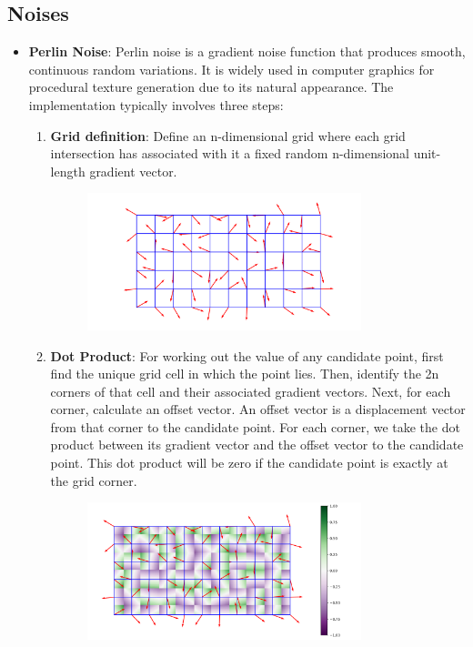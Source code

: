 \documentclass[12pt]{article}
\begin{document}
\subsection {Noises}
\begin{itemize}
    \item \textbf{Perlin Noise}:
    \newline
    Perlin noise is a gradient noise function that produces smooth, continuous random variations. It is widely used in computer graphics for procedural texture generation due to its natural appearance. 
    The implementation typically involves three steps:
    \begin {enumerate}
        \item \textbf{Grid definition}:
        \newline 
        Define an n-dimensional grid where each grid intersection has associated with it a fixed random n-dimensional unit-length gradient vector.

        \begin{figure}[H]
            \centering
            \includegraphics[width=0.8\textwidth]{Images/perlinGrid.png}
        \end{figure}

        \item \textbf{Dot Product}:
        \newline
        For working out the value of any candidate point, first find the unique grid cell in which the point lies. Then, identify the 2n corners of that cell and their associated gradient vectors. 
        Next, for each corner, calculate an offset vector. An offset vector is a displacement vector from that corner to the candidate point.
        For each corner, we take the dot product between its gradient vector and the offset vector to the candidate point. This dot product will be zero if the candidate point is exactly at the grid corner.

        \begin{figure}[H]
            \centering
            \includegraphics[width=0.8\textwidth]{Images/perlinDot.png}
        \end{figure}


\end{enumerate}
\end{itemize}
\end{document}

